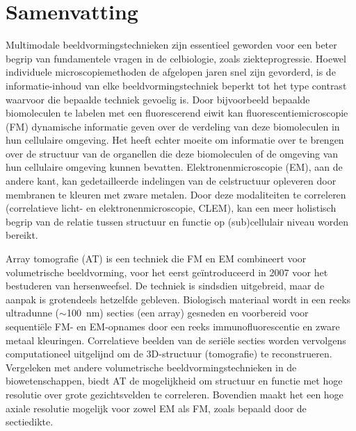 \chapter*{Samenvatting}

Multimodale beeldvormingstechnieken zijn essentieel geworden voor een beter begrip van fundamentele vragen in de celbiologie, zoals ziekteprogressie. Hoewel individuele microscopiemethoden de afgelopen jaren snel zijn gevorderd, is de informatie-inhoud van elke beeldvormingstechniek beperkt tot het type contrast waarvoor die bepaalde techniek gevoelig is. Door bijvoorbeeld bepaalde biomoleculen te labelen met een fluorescerend eiwit kan fluorescentiemicroscopie (FM) dynamische informatie geven over de verdeling van deze biomoleculen in hun cellulaire omgeving. Het heeft echter moeite om informatie over te brengen over de structuur van de organellen die deze biomoleculen of de omgeving van hun cellulaire omgeving kunnen bevatten. Elektronenmicroscopie (EM), aan de andere kant, kan gedetailleerde indelingen van de celstructuur opleveren door membranen te kleuren met zware metalen. Door deze modaliteiten te correleren (correlatieve licht- en elektronenmicroscopie, CLEM), kan een meer holistisch begrip van de relatie tussen structuur en functie op (sub)cellulair niveau worden bereikt.

Array tomografie (AT) is een techniek die FM en EM combineert voor volumetrische beeldvorming, voor het eerst geïntroduceerd in 2007 voor het bestuderen van hersenweefsel. De techniek is sindsdien uitgebreid, maar de aanpak is grotendeels hetzelfde gebleven. Biologisch materiaal wordt in een reeks ultradunne (${\sim}$\SI{100}{\nano\meter}) secties (een array) gesneden en voorbereid voor sequentiële FM- en EM-opnames door een reeks immunofluorescentie en zware metaal kleuringen. Correlatieve beelden van de seriële secties worden vervolgens computationeel uitgelijnd om de 3D-structuur (tomografie) te reconstrueren. Vergeleken met andere volumetrische beeldvormingstechnieken in de biowetenschappen, biedt AT de mogelijkheid om structuur en functie met hoge resolutie over grote gezichtsvelden te correleren. Bovendien maakt het een hoge axiale resolutie mogelijk voor zowel EM als FM, zoals bepaald door de sectiedikte.


